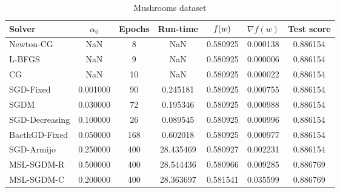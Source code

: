 \begin{table}
\caption{Mushrooms dataset}
\label{tab:mush-tab}
\centering
\begin{tabular}{lS[round-precision=3]S[drop-zero-decimal]S[round-precision=4]S[round-precision=6]S[exponent-mode=scientific]S[round-precision=6]}
\toprule
Solver & {$\alpha_0$} & {Epochs} & {Run-time} & {$\operatorname*{\mathit{f}}(w)$} & {$\nabla f(w)$} & {Test score} \\
\midrule
Newton-CG & NaN & 8 & NaN & 0.580925 & 0.000138 & 0.886154 \\
L-BFGS & NaN & 9 & NaN & 0.580925 & 0.000006 & 0.886154 \\
CG & NaN & 10 & NaN & 0.580925 & 0.000022 & 0.886154 \\
SGD-Fixed & 0.001000 & 90 & 0.245181 & 0.580925 & 0.000755 & 0.886154 \\
SGDM & 0.030000 & 72 & 0.195346 & 0.580925 & 0.000988 & 0.886154 \\
SGD-Decreasing & 0.100000 & 26 & 0.089545 & 0.580925 & 0.000996 & 0.886154 \\
BacthGD-Fixed & 0.050000 & 168 & 0.602018 & 0.580925 & 0.000977 & 0.886154 \\
SGD-Armijo & 0.250000 & 400 & 28.435469 & 0.580927 & 0.002231 & 0.886154 \\
MSL-SGDM-R & 0.500000 & 400 & 28.544436 & 0.580966 & 0.009285 & 0.886769 \\
MSL-SGDM-C & 0.200000 & 400 & 28.363697 & 0.581541 & 0.035599 & 0.886769 \\
\bottomrule
\end{tabular}
\end{table}


